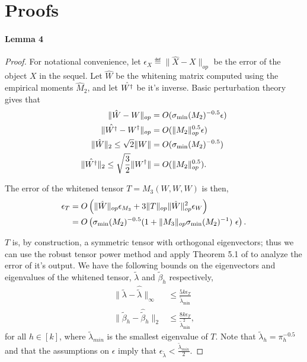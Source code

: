 \section{Proofs}
\label{sec:proofs}

\paragraph{Lemma 4}

\begin{proof}

For notational convenience, let $\epsilon_{X} \eqdef \|\hat X - X\|_{op}$ be
the error of the object $X$ in the sequel. Let $\hat W$ be the whitening
matrix computed using the empirical moments $\hat M_2$, and let $\hat
{W^{\dagger}}$ be it's inverse. Basic perturbation theory gives that 
\begin{align*}
\|\hat W - W\|_{op} &= O(\sigma_\text{\rm min}(M_2)^{-0.5} \epsilon)\\
\|\hat {W^{\dagger}} - W^{\dagger}\|_{op} &= O(\|M_2\|_{op}^{0.5} \epsilon)\\ 
\|\hat W\|_2 \le \sqrt{2} \|W\| &= O(\sigma_\text{\rm min}(M_2)^{-0.5}) \\ 
\|\hat {W^{\dagger}}\|_2 \le \sqrt\frac{3}{2} \|W^{\dagger}\| &= O(\|M_2\|_{op}^{0.5}). 
\end{align*}

The error of the whitened tensor $T = M_3(W,W,W)$ is then,
\begin{align*}
\epsilon_T 
&= O\left( \|\hat W\|_{op} \epsilon_{M_3} + 3 \|T\|_{op} \|\hat W\|_{op}^2 \epsilon_{W} \right ) \\
  &= O\left(\sigma_\text{\rm min}(M_2)^{-0.5} (1 + \|M_3\|_{op} \sigma_\text{\rm min}(M_2)^{-1} )~\epsilon\right).
\end{align*}

$T$ is, by construction, a symmetric tensor with orthogonal
eigenvectors; thus we can use the robust tensor power method and apply
Theorem 5.1 of \citet{AnandkumarGeHsu2012} to analyze the error of it's
output. We have the following bounds on the eigenvectors and eigenvalues
of the whitened tensor, $\tilde \lambda$ and $\tilde \beta_h$ respectively, 
\begin{align*}
  \|\tilde \lambda - \hat {\tilde \lambda} \|_{\infty} 
    &\le \frac{5 k \epsilon_T}{\tilde \lambda_{\min}} \\
    \|\tilde \beta_h - \hat {\tilde \beta}_h \|_2 
    &\le \frac{8 k \epsilon_T}{\tilde \lambda_{\min}^2},
\end{align*}
for all $h \in [k]$, where $\tilde \lambda_{min}$ is the smallest
eigenvalue of $T$. Note that $\tilde \lambda_h = \pi_h^{-0.5}$ and that
the assumptions on $\epsilon$ imply that $\epsilon_{\tilde \lambda}
< \frac{\tilde \lambda_{min}}{2}$.


\end{proof}

